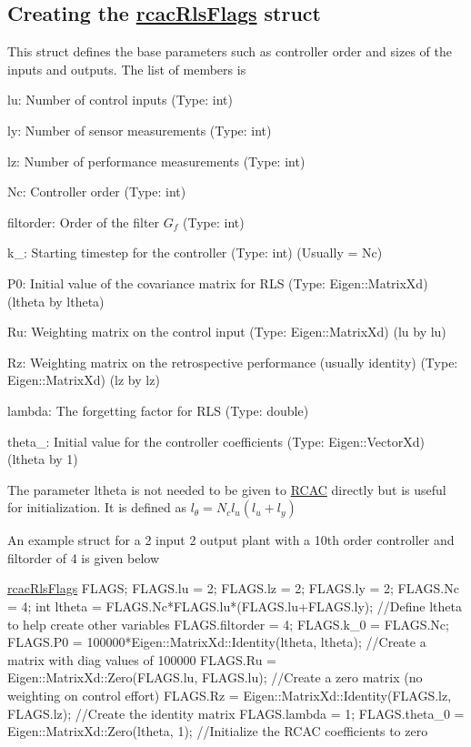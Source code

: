 \subsection*{Creating the \hyperlink{structrcac_rls_flags}{rcac\+Rls\+Flags} struct }

This struct defines the base parameters such as controller order and sizes of the inputs and outputs. The list of members is
\begin{DoxyItemize}
\item lu\+: Number of control inputs (Type\+: int)
\item ly\+: Number of sensor measurements (Type\+: int)
\item lz\+: Number of performance measurements (Type\+: int)
\item Nc\+: Controller order (Type\+: int)
\item filtorder\+: Order of the filter $G_f$ (Type\+: int)
\item k\+\_\+: Starting timestep for the controller (Type\+: int) (Usually = Nc)
\item P0\+: Initial value of the covariance matrix for R\+LS (Type\+: Eigen\+::\+Matrix\+Xd) (ltheta by ltheta)
\item Ru\+: Weighting matrix on the control input (Type\+: Eigen\+::\+Matrix\+Xd) (lu by lu)
\item Rz\+: Weighting matrix on the retrospective performance (usually identity) (Type\+: Eigen\+::\+Matrix\+Xd) (lz by lz)
\item lambda\+: The forgetting factor for R\+LS (Type\+: double)
\item theta\+\_\+: Initial value for the controller coefficients (Type\+: Eigen\+::\+Vector\+Xd) (ltheta by 1)
\end{DoxyItemize}

The parameter ltheta is not needed to be given to \hyperlink{class_r_c_a_c}{R\+C\+AC} directly but is useful for initialization. It is defined as $ l_\theta = N_c l_u(l_u+l_y) $

An example struct for a 2 input 2 output plant with a 10th order controller and filtorder of 4 is given below 
\begin{DoxyCode}
\hyperlink{structrcac_rls_flags}{rcacRlsFlags} FLAGS;
FLAGS.lu = 2;
FLAGS.lz = 2;
FLAGS.ly = 2;
FLAGS.Nc = 4;
\textcolor{keywordtype}{int} ltheta = FLAGS.Nc*FLAGS.lu*(FLAGS.lu+FLAGS.ly); \textcolor{comment}{//Define ltheta to help create other variables}
FLAGS.filtorder = 4;
FLAGS.k\_0 = FLAGS.Nc;
FLAGS.P0 = 100000*Eigen::MatrixXd::Identity(ltheta, ltheta); \textcolor{comment}{//Create a matrix with diag values of 100000}
FLAGS.Ru = Eigen::MatrixXd::Zero(FLAGS.lu, FLAGS.lu); \textcolor{comment}{//Create a zero matrix (no weighting on control
       effort)}
FLAGS.Rz = Eigen::MatrixXd::Identity(FLAGS.lz, FLAGS.lz); \textcolor{comment}{//Create the identity matrix}
FLAGS.lambda = 1;
FLAGS.theta\_0 = Eigen::MatrixXd::Zero(ltheta, 1); \textcolor{comment}{//Initialize the RCAC coefficients to zero}
\end{DoxyCode}


